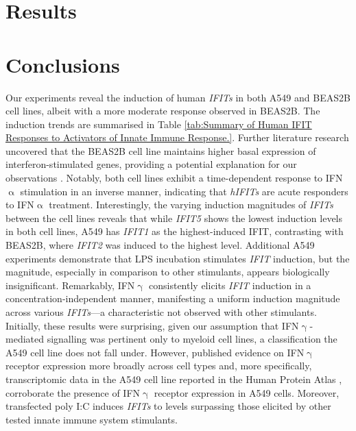 \section{Results} \label{sec:Results-Chapter 1}


\section{Conclusions} \label{sec:Conclusions Chapter 1}
Our experiments reveal the induction of human \textit{IFITs} in both A549 and BEAS2B cell lines, albeit with a more moderate response observed in BEAS2B. The induction trends are summarised in Table \ref{tab:Summary of Human IFIT Responses to Activators of Innate Immune Response.}. Further literature research uncovered that the BEAS2B cell line maintains higher basal expression of interferon-stimulated genes, providing a potential explanation for our observations \cite{Seng2014HighResistance}. Notably, both cell lines exhibit a time-dependent response to IFN$\upalpha$ stimulation in an inverse manner, indicating that \textit{hIFITs} are acute responders to IFN$\upalpha$ treatment. Interestingly, the varying induction magnitudes of \textit{IFITs} between the cell lines reveals that while \textit{IFIT5} shows the lowest induction levels in both cell lines, A549 has \textit{IFIT1} as the highest-induced IFIT, contrasting with BEAS2B, where \textit{IFIT2} was induced to the highest level. Additional A549 experiments demonstrate that LPS incubation stimulates \textit{IFIT} induction, but the magnitude, especially in comparison to other stimulants, appears biologically insignificant. Remarkably, IFN$\upgamma$ consistently elicits \textit{IFIT} induction in a concentration-independent manner, manifesting a uniform induction magnitude across various \textit{IFITs}—a characteristic not observed with other stimulants. Initially, these results were surprising, given our assumption that IFN$\upgamma$-mediated signalling was pertinent only to myeloid cell lines, a classification the A549 cell line does not fall under. However, published evidence on IFN$\upgamma$ receptor expression more broadly across cell types \cite{Ivashkiv2018IFN:Immunotherapy} and, more specifically, transcriptomic data in the A549 cell line reported in the Human Protein Atlas \cite{Uhlen2015Tissue-basedProteome}, corroborate the presence of IFN$\upgamma$ receptor expression in A549 cells. Moreover, transfected poly I:C induces \textit{IFITs} to levels surpassing those elicited by other tested innate immune system stimulants.

